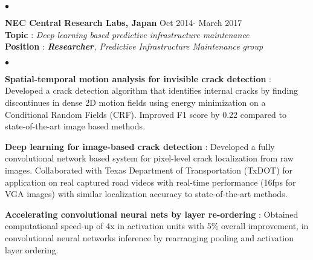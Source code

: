 \documentclass[margin,line]{res}
\newenvironment{list2}{
  \begin{list}{$\bullet$}{%
      \setlength{\itemsep}{0in}
      \setlength{\parsep}{0in} \setlength{\parskip}{0in}
      \setlength{\topsep}{0in} \setlength{\partopsep}{0in} 
      \setlength{\leftmargin}{0.2in}}}{\end{list}}
\begin{document}
\begin{resume}
\begin{list2}
  \end{list2}
  

  
  \textbf{ NEC Central Research Labs, Japan } \hfill Oct 2014- March 2017  \\
  \textbf{Topic} : \textit{Deep learning based predictive infrastructure maintenance }\\
  \textbf{Position} : \textit{\textbf{Researcher}, Predictive Infrastructure Maintenance group}\\

  \begin{list2}

  	  \item \textbf{Spatial-temporal motion analysis for invisible crack detection} : %
  	  Developed a crack detection algorithm that identifies internal cracks by finding discontinues in dense 2D motion fields using energy minimization on a Conditional Random Fields (CRF). Improved F1 score by 0.22 compared to state-of-the-art image based methods.\\

\pagebreak

  	\item \textbf{Deep learning for image-based crack detection} : %
  	Developed a fully convolutional network based system for pixel-level crack localization from raw images. Collaborated with Texas Department of Transportation (TxDOT) for application on real captured road videos with real-time performance (16fps for VGA images) with similar localization accuracy to state-of-the-art methods.\\


  	\item \textbf{Accelerating convolutional neural nets by layer re-ordering} :  %
  	Obtained computational speed-up of 4x in activation units with 5\% overall improvement, in convolutional neural networks inference by rearranging pooling and activation layer ordering. \\


\end{list2}
\end{resume}
\end{document}
